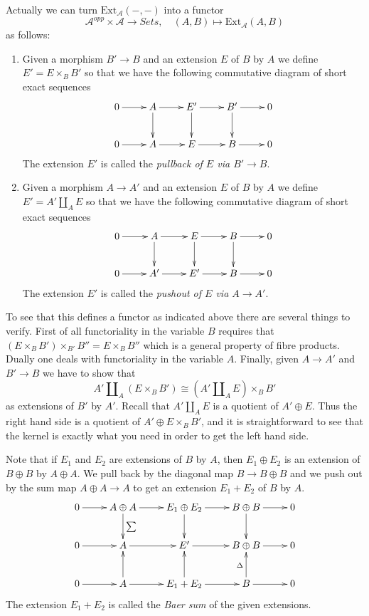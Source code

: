 \medskip\noindent
Actually we can turn $\text{Ext}_\mathcal{A}(-, -)$ into a
functor
$$
\mathcal{A}^{opp} \times \mathcal{A} \longrightarrow \textit{Sets}, \quad
(A, B) \longmapsto \text{Ext}_\mathcal{A}(A, B)
$$
as follows:
\begin{enumerate}
\item Given a morphism $B' \to B$ and an extension
$E$ of $B$ by $A$ we define $E' = E \times_B B'$
so that we have the following commutative diagram
of short exact sequences
$$
\xymatrix{
0 \ar[r] & A \ar[r] \ar[d] & E' \ar[r] \ar[d] & B' \ar[r] \ar[d] & 0 \\
0 \ar[r] & A \ar[r] & E \ar[r] & B \ar[r] & 0
}
$$
The extension $E'$ is called the {\it pullback of $E$ via
$B' \to B$}.
\item Given a morphism $A \to A'$ and an extension
$E$ of $B$ by $A$ we define $E' = A' \coprod_A E$
so that we have the following commutative diagram
of short exact sequences
$$
\xymatrix{
0 \ar[r] & A \ar[r] \ar[d] & E \ar[r] \ar[d] & B \ar[r] \ar[d] & 0 \\
0 \ar[r] & A' \ar[r] & E' \ar[r] & B \ar[r] & 0
}
$$
The extension $E'$ is called the {\it pushout of $E$ via
$A \to A'$}.
\end{enumerate}
To see that this defines a functor as indicated above
there are several things to verify. First of all
functoriality in the variable $B$ requires that
$(E \times_B B') \times_{B'} B'' = E \times_B B''$
which is a general property of fibre products.
Dually one deals with functoriality in the
variable $A$. Finally, given $A \to A'$ and
$B' \to B$ we have to show that
$$
A' \coprod\nolimits_A (E \times_B B')
\cong
(A' \coprod\nolimits_A E)\times_B B'
$$
as extensions of $B'$ by $A'$. Recall that $A' \coprod_A E$
is a quotient of $A' \oplus E$.
Thus the right hand side is a quotient of
$A' \oplus E \times_B B'$, and it is straightforward to see that
the kernel is exactly what you need in order to
get the left hand side.

\medskip\noindent
Note that if $E_1$ and $E_2$ are extensions of
$B$ by $A$, then $E_1\oplus E_2$ is an extension
of $B \oplus B$ by $A\oplus A$. We pull back by
the diagonal map $B \to B \oplus B$ and we push
out by the sum map $A \oplus A \to A$ to get
an extension $E_1 + E_2$ of $B$ by $A$.
$$
\xymatrix{
0 \ar[r] &
A \oplus A \ar[r] \ar[d]^{\sum} &
E_1 \oplus E_2 \ar[r] \ar[d] &
B \oplus B \ar[r] \ar[d] &
0 \\
0 \ar[r] &
A \ar[r] &
E' \ar[r] &
B \oplus B \ar[r] &
0\\
0 \ar[r] &
A \ar[r] \ar[u] &
E_1 + E_2 \ar[r] \ar[u] &
B \ar[r] \ar[u]^{\Delta} &
0
}
$$
The extension $E_1 + E_2$ is called the {\it Baer sum} of the
given extensions.

